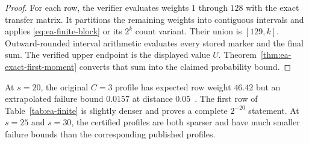\begin{proof}
For each row, the verifier evaluates weights $1$ through $128$ with the exact
transfer matrix.  It partitions the remaining weights into contiguous
intervals and applies \eqref{eq:ea-finite-block} or its $2^k$ count variant.
Their union is $[129,k]$.  Outward-rounded interval arithmetic
evaluates every stored marker and the final sum.  The verified upper endpoint
is the displayed value $U$.  Theorem~\ref{thm:ea-exact-first-moment} converts
that sum into the claimed probability bound.
\end{proof}

At $s=20$, the original $C=3$ profile has expected row weight $46.42$ but an
extrapolated failure bound $0.0157$ at distance $0.05$~\cite{EA}.  The first
row of Table~\ref{tab:ea-finite} is slightly denser and proves a complete
$2^{-20}$ statement.  At $s=25$ and $s=30$, the certified profiles are both
sparser and have much smaller failure bounds than the corresponding published
profiles.
